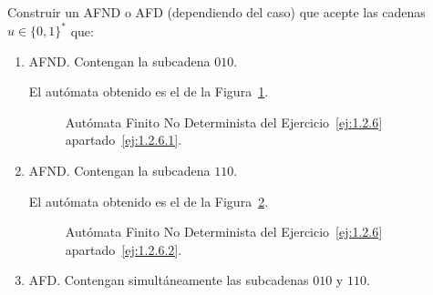 \begin{ejercicio} \label{ej:1.2.6}
    Construir un AFND o AFD (dependiendo del caso) que acepte las cadenas $u \in \{0, 1\}^*$ que:
    \begin{enumerate}
        \item AFND\@. Contengan la subcadena $010$.~\label{ej:1.2.6.1}
        
        El autómata obtenido es el de la Figura~\ref{fig:ej:1.2.6.1}.
        \begin{figure}[H]
            \centering
            \caption{Autómata Finito No Determinista del Ejercicio~\ref{ej:1.2.6} apartado~\ref{ej:1.2.6.1}.}
            \label{fig:ej:1.2.6.1}
        \end{figure}
        \item AFND\@. Contengan la subcadena $110$. \label{ej:1.2.6.2}
        
        El autómata obtenido es el de la Figura~\ref{fig:ej:1.2.6.2}.
        \begin{figure}[H]
            \centering
            \caption{Autómata Finito No Determinista del Ejercicio~\ref{ej:1.2.6} apartado~\ref{ej:1.2.6.2}.}
            \label{fig:ej:1.2.6.2}
        \end{figure}
        \item AFD\@. Contengan simultáneamente las subcadenas $010$ y $110$. \label{ej:1.2.6.3}
        

\end{enumerate}
\end{ejercicio}
